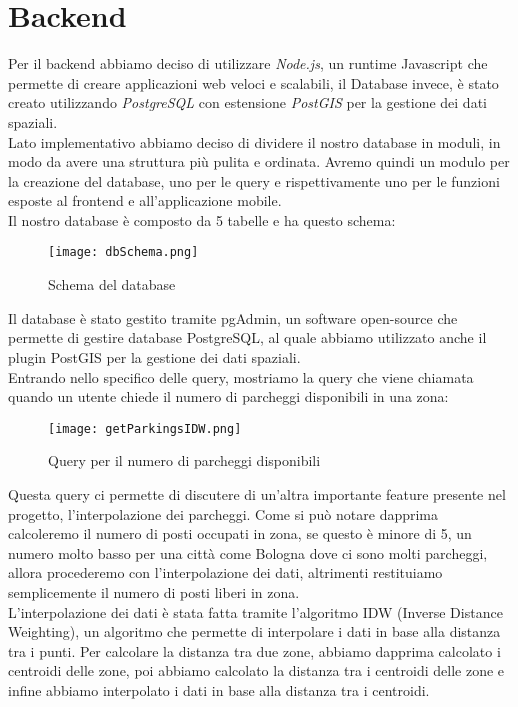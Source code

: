 \documentclass[../../Report.tex]{subfiles}
\begin{document}
\section{Backend}
    Per il backend abbiamo deciso di utilizzare \emph{Node.js}, un runtime Javascript che permette di creare applicazioni web veloci e scalabili, il Database invece, è stato creato utilizzando \emph{PostgreSQL} con estensione \emph{PostGIS} per la gestione dei dati spaziali.\\
    Lato implementativo abbiamo deciso di dividere il nostro database in moduli, in modo da avere una struttura più pulita e ordinata. Avremo quindi un modulo per la creazione del database, uno per le query e rispettivamente uno per le funzioni esposte al frontend e all'applicazione mobile.\\
    Il nostro database è composto da 5 tabelle e ha questo schema:
    \begin{figure}[H]
      \texttt{[image: dbSchema.png]}
      \centering
        \caption{Schema del database}
        \label{fig:schema}  
    \end{figure}
    Il database è stato gestito tramite pgAdmin, un software open-source che permette di gestire database PostgreSQL, al quale abbiamo utilizzato anche il plugin PostGIS per la gestione dei dati spaziali.\\
    Entrando nello specifico delle query, mostriamo la query che viene chiamata quando un utente chiede il numero di parcheggi disponibili in una zona:
    \begin{figure}[H]
      \texttt{[image: getParkingsIDW.png]}
      \centering
      \caption{Query per il numero di parcheggi disponibili}
      \label{fig:query}
    \end{figure}
    Questa query ci permette di discutere di un'altra importante feature presente nel progetto, l'interpolazione dei parcheggi. Come si può notare dapprima calcoleremo il numero di posti occupati in zona, se questo è minore di 5, un numero molto basso per una città come Bologna dove ci sono molti parcheggi, allora procederemo con l'interpolazione dei dati, altrimenti restituiamo semplicemente il numero di posti liberi in zona.\\
    L'interpolazione dei dati è stata fatta tramite l'algoritmo IDW (Inverse Distance Weighting), un algoritmo che permette di interpolare i dati in base alla distanza tra i punti. Per calcolare la distanza tra due zone, abbiamo dapprima calcolato i centroidi delle zone, poi abbiamo calcolato la distanza tra i centroidi delle zone e infine abbiamo interpolato i dati in base alla distanza tra i centroidi.\\
\end{document}
